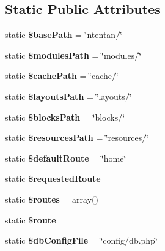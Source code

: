 \subsection*{Static Public Attributes}
\begin{DoxyCompactItemize}
\item 
\hypertarget{class_ntentan_a8cf819d855bf68d46c2672cb76805fd7}{
static {\bfseries \$basePath} = \char`\"{}ntentan/\char`\"{}}
\label{class_ntentan_a8cf819d855bf68d46c2672cb76805fd7}

\item 
\hypertarget{class_ntentan_a9ad9dcbaae9a85da518baf5447510b74}{
static {\bfseries \$modulesPath} = \char`\"{}modules/\char`\"{}}
\label{class_ntentan_a9ad9dcbaae9a85da518baf5447510b74}

\item 
\hypertarget{class_ntentan_a21185751e678cbbd74cc2941b2fe885e}{
static {\bfseries \$cachePath} = \char`\"{}cache/\char`\"{}}
\label{class_ntentan_a21185751e678cbbd74cc2941b2fe885e}

\item 
\hypertarget{class_ntentan_a19a998727fa616b1722674eeeadbbfbd}{
static {\bfseries \$layoutsPath} = \char`\"{}layouts/\char`\"{}}
\label{class_ntentan_a19a998727fa616b1722674eeeadbbfbd}

\item 
\hypertarget{class_ntentan_ad616af2da8952556259f16f4b6af5061}{
static {\bfseries \$blocksPath} = \char`\"{}blocks/\char`\"{}}
\label{class_ntentan_ad616af2da8952556259f16f4b6af5061}

\item 
\hypertarget{class_ntentan_a0f677a48241dd38a90ecde76679123a2}{
static {\bfseries \$resourcesPath} = \char`\"{}resources/\char`\"{}}
\label{class_ntentan_a0f677a48241dd38a90ecde76679123a2}

\item 
\hypertarget{class_ntentan_a751c7c8493204f45de3d636e8a5d2baf}{
static {\bfseries \$defaultRoute} = \char`\"{}home\char`\"{}}
\label{class_ntentan_a751c7c8493204f45de3d636e8a5d2baf}

\item 
\hypertarget{class_ntentan_af4af743b01b287ba5bc81046b6f62124}{
static {\bfseries \$requestedRoute}}
\label{class_ntentan_af4af743b01b287ba5bc81046b6f62124}

\item 
\hypertarget{class_ntentan_a37d0f00bcb251c7208921a49cf52b5fe}{
static {\bfseries \$routes} = array()}
\label{class_ntentan_a37d0f00bcb251c7208921a49cf52b5fe}

\item 
\hypertarget{class_ntentan_adbd483beec917e9bcbdd014e27fdbf50}{
static {\bfseries \$route}}
\label{class_ntentan_adbd483beec917e9bcbdd014e27fdbf50}

\item 
\hypertarget{class_ntentan_a06a99fa9e9c1e45bbc1b354b357a5dd4}{
static {\bfseries \$dbConfigFile} = \char`\"{}config/db.php\char`\"{}}
\label{class_ntentan_a06a99fa9e9c1e45bbc1b354b357a5dd4}

\end{DoxyCompactItemize}


